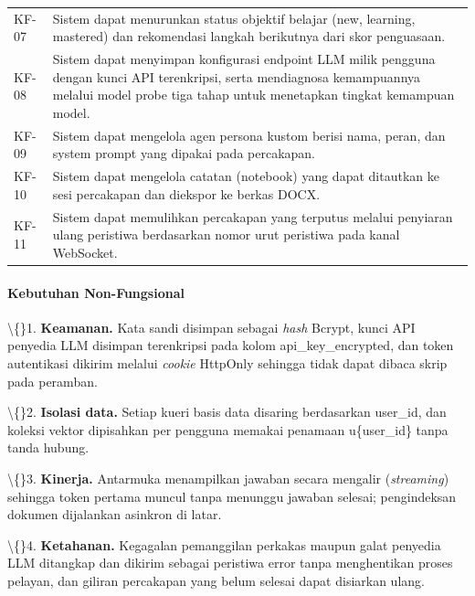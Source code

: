 \documentclass[12pt,a4paper]{article}
\begin{document}
\begin{table}[h]
\begin{tabular}{ll}
KF-07 & Sistem dapat menurunkan status objektif belajar (new, learning, mastered) dan rekomendasi langkah berikutnya dari skor penguasaan. \\

KF-08 & Sistem dapat menyimpan konfigurasi endpoint LLM milik pengguna dengan kunci API terenkripsi, serta mendiagnosa kemampuannya melalui model probe tiga tahap untuk menetapkan tingkat kemampuan model. \\

KF-09 & Sistem dapat mengelola agen persona kustom berisi nama, peran, dan system prompt yang dipakai pada percakapan. \\

KF-10 & Sistem dapat mengelola catatan (notebook) yang dapat ditautkan ke sesi percakapan dan diekspor ke berkas DOCX. \\

KF-11 & Sistem dapat memulihkan percakapan yang terputus melalui penyiaran ulang peristiwa berdasarkan nomor urut peristiwa pada kanal WebSocket. \\

\bottomrule

\end{tabular}

\end{table}

\paragraph*{Kebutuhan Non-Fungsional}

\textbackslash\{\}1. \textbf{Keamanan.} Kata sandi disimpan sebagai \textit{hash} Bcrypt, kunci API penyedia LLM disimpan terenkripsi pada kolom api\_key\_encrypted, dan token autentikasi dikirim melalui \textit{cookie} HttpOnly sehingga tidak dapat dibaca skrip pada peramban.



\textbackslash\{\}2. \textbf{Isolasi data.} Setiap kueri basis data disaring berdasarkan user\_id, dan koleksi vektor dipisahkan per pengguna memakai penamaan u\{user\_id\} tanpa tanda hubung.



\textbackslash\{\}3. \textbf{Kinerja.} Antarmuka menampilkan jawaban secara mengalir (\textit{streaming}) sehingga token pertama muncul tanpa menunggu jawaban selesai; pengindeksan dokumen dijalankan asinkron di latar.



\textbackslash\{\}4. \textbf{Ketahanan.} Kegagalan pemanggilan perkakas maupun galat penyedia LLM ditangkap dan dikirim sebagai peristiwa error tanpa menghentikan proses pelayan, dan giliran percakapan yang belum selesai dapat disiarkan ulang.
\end{document}
